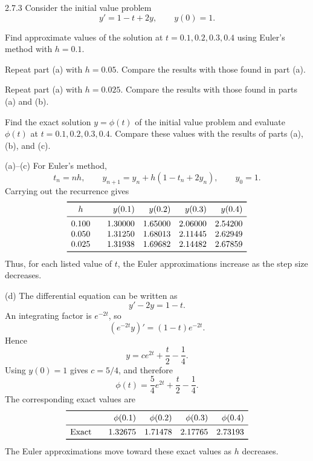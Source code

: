 \documentclass[11pt,oneside]{article}
\begin{document}

\begin{problem}{2.7.3}
Consider the initial value problem
\[
    y'=1-t+2y,
    \qquad
    y(0)=1.
\]
\begin{problemsubparts}
    \item Find approximate values of the solution at $t=0.1,0.2,0.3,0.4$ using Euler's method with $h=0.1$.
    \item Repeat part (a) with $h=0.05$. Compare the results with those found in part (a).
    \item Repeat part (a) with $h=0.025$. Compare the results with those found in parts (a) and (b).
    \item Find the exact solution $y=\phi(t)$ of the initial value problem and evaluate $\phi(t)$ at $t=0.1,0.2,0.3,0.4$. Compare these values with the results of parts (a), (b), and (c).
\end{problemsubparts}
\end{problem}

\begin{solution}
\noindent\textup{(a)--(c)} For Euler's method,
\[
    t_n=nh,
    \qquad
    y_{n+1}=y_n+h(1-t_n+2y_n),
    \qquad
    y_0=1.
\]
Carrying out the recurrence gives
\[
\begin{array}{c@{\qquad}rrrr}
\toprule
h & y(0.1) & y(0.2) & y(0.3) & y(0.4) \\
\midrule
0.100 & 1.30000 & 1.65000 & 2.06000 & 2.54200 \\
0.050 & 1.31250 & 1.68013 & 2.11445 & 2.62949 \\
0.025 & 1.31938 & 1.69682 & 2.14482 & 2.67859 \\
\bottomrule
\end{array}
\]
Thus, for each listed value of $t$, the Euler approximations increase as the step size decreases.

\medskip
\noindent\textup{(d)} The differential equation can be written as
\[
    y'-2y=1-t.
\]
An integrating factor is $e^{-2t}$, so
\[
    (e^{-2t}y)'=(1-t)e^{-2t}.
\]
Hence
\[
    y=ce^{2t}+\frac{t}{2}-\frac14.
\]
Using $y(0)=1$ gives $c=5/4$, and therefore
\[
    \boxed{\phi(t)=\frac54e^{2t}+\frac{t}{2}-\frac14}.
\]
The corresponding exact values are
\[
\begin{array}{c@{\qquad}rrrr}
\toprule
 & \phi(0.1) & \phi(0.2) & \phi(0.3) & \phi(0.4) \\
\midrule
\text{Exact} & 1.32675 & 1.71478 & 2.17765 & 2.73193 \\
\bottomrule
\end{array}
\]
The Euler approximations move toward these exact values as $h$ decreases.
\end{solution}
\end{document}
